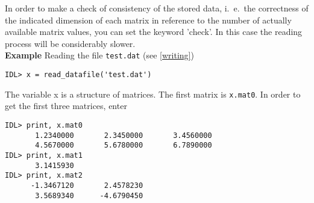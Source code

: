 In order to make a check of consistency of the stored data, i.~e.\ 
the correctness of the indicated dimension of each matrix in reference
to the  number of actually available matrix values, you can set the
keyword 'check'. In this case the reading process will be considerably
slower. \\
\textbf{Example} \hspace{1ex} Reading the file \texttt{test.dat} (see
\ref{writing})
\begin{verbatim}
IDL> x = read_datafile('test.dat')
\end{verbatim}
The variable x is a structure of matrices. The first matrix is
\texttt{x.mat0}. In order to get the first three matrices, enter
\begin{verbatim}
IDL> print, x.mat0
       1.2340000       2.3450000       3.4560000
       4.5670000       5.6780000       6.7890000
IDL> print, x.mat1
       3.1415930
IDL> print, x.mat2
      -1.3467120       2.4578230
       3.5689340      -4.6790450
\end{verbatim}
